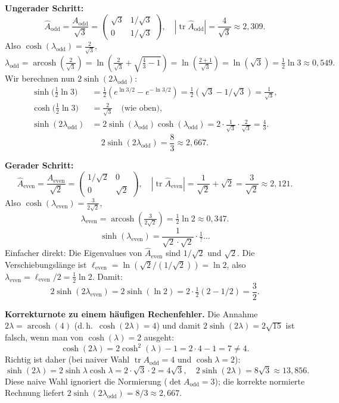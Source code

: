 \documentclass[12pt,a4paper]{article}
\newcommand{\arcosh}{\operatorname{arcosh}}
\newcommand{\sinh}{\operatorname{sinh}}
\renewcommand{\cosh}{\operatorname{cosh}}
\newcommand{\tr}{\operatorname{tr}}
\begin{document}
\medskip
\textbf{Ungerader Schritt:}
\[
  \hat A_{\text{odd}} = \frac{A_{\text{odd}}}{\sqrt{3}}
  = \begin{pmatrix} \sqrt{3} & 1/\sqrt{3} \\ 0 & 1/\sqrt{3} \end{pmatrix},
  \quad |\tr \hat A_{\text{odd}}| = \frac{4}{\sqrt{3}} \approx 2{,}309.
\]
Also $\cosh(\lambda_{\text{odd}}) = \tfrac{2}{\sqrt{3}}$,
\[
  \lambda_{\text{odd}} = \arcosh\!\left(\tfrac{2}{\sqrt{3}}\right)
  = \ln\!\left(\tfrac{2}{\sqrt{3}} + \sqrt{\tfrac{4}{3}-1}\right)
  = \ln\!\left(\tfrac{2+1}{\sqrt{3}}\right) = \ln\!\left(\sqrt{3}\right)
  = \tfrac{1}{2}\ln 3 \approx 0{,}549.
\]
Wir berechnen nun $2\sinh(2\lambda_{\text{odd}})$:
\begin{align*}
  \sinh\!\bigl(\tfrac{1}{2}\ln 3\bigr) &= \tfrac{1}{2}(e^{\ln 3/2} - e^{-\ln 3/2})
  = \tfrac{1}{2}(\sqrt{3} - 1/\sqrt{3}) = \frac{1}{\sqrt{3}},\\
  \cosh\!\bigl(\tfrac{1}{2}\ln 3\bigr) &= \frac{2}{\sqrt{3}} \quad\text{(wie oben)},\\
  \sinh(2\lambda_{\text{odd}}) &= 2\sinh(\lambda_{\text{odd}})\cosh(\lambda_{\text{odd}})
  = 2 \cdot \frac{1}{\sqrt{3}} \cdot \frac{2}{\sqrt{3}} = \frac{4}{3}.
\end{align*}
\[
  \boxed{2\sinh(2\lambda_{\text{odd}}) = \frac{8}{3} \approx 2{,}667.}
\]

\medskip
\textbf{Gerader Schritt:}
\[
  \hat A_{\text{even}} = \frac{A_{\text{even}}}{\sqrt{2}}
  = \begin{pmatrix} 1/\sqrt{2} & 0 \\ 0 & \sqrt{2} \end{pmatrix},
  \quad |\tr \hat A_{\text{even}}| = \frac{1}{\sqrt{2}} + \sqrt{2}
  = \frac{3}{\sqrt{2}} \approx 2{,}121.
\]
Also $\cosh(\lambda_{\text{even}}) = \tfrac{3}{2\sqrt{2}}$,
\[
  \lambda_{\text{even}} = \arcosh\!\left(\tfrac{3}{2\sqrt{2}}\right) = \tfrac{1}{2}\ln 2
  \approx 0{,}347.
\]
\[
  \sinh(\lambda_{\text{even}}) = \frac{1}{\sqrt{2} \cdot \sqrt{2}}
  \cdot\tfrac{1}{?}\ldots
\]
Einfacher direkt: Die Eigenvalues von $\hat A_{\text{even}}$ sind $1/\sqrt{2}$ und $\sqrt{2}$.
Die Verschiebungslänge ist $\ell_{\text{even}} = \ln(\sqrt{2}/(1/\sqrt{2})) = \ln 2$,
also $\lambda_{\text{even}} = \ell_{\text{even}}/2 = \tfrac{1}{2}\ln 2$.
Damit:
\[
  2\sinh(2\lambda_{\text{even}}) = 2\sinh(\ln 2)
  = 2 \cdot \tfrac{1}{2}(2 - 1/2) = \frac{3}{2}.
\]

\medskip
\textbf{Korrekturnote zu einem häufigen Rechenfehler.}
Die Annahme $2\lambda = \arcosh(4)$ (d.\,h.\ $\cosh(2\lambda) = 4$)
und damit $2\sinh(2\lambda) = 2\sqrt{15}$ ist falsch,
wenn man von $\cosh(\lambda) = 2$ ausgeht:
\[
  \cosh(2\lambda) = 2\cosh^2(\lambda) - 1 = 2 \cdot 4 - 1 = 7 \ne 4.
\]
Richtig ist daher (bei naiver Wahl $\tr A_{\text{odd}} = 4$ und $\cosh\lambda = 2$):
\[
  \sinh(2\lambda) = 2\sinh\lambda \cosh\lambda = 2\cdot\sqrt{3}\cdot 2 = 4\sqrt{3},
  \quad 2\sinh(2\lambda) = 8\sqrt{3} \approx 13{,}856.
\]
Diese naive Wahl ignoriert die Normierung ($\det A_{\text{odd}} = 3$); die korrekte
normierte Rechnung liefert $2\sinh(2\lambda_{\text{odd}}) = 8/3 \approx 2{,}667$.
\end{document}

